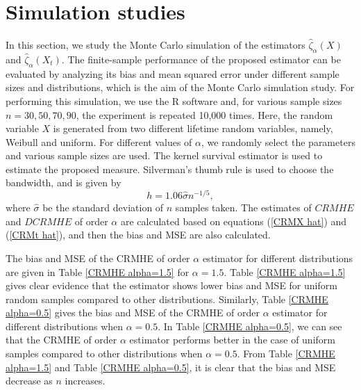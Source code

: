 \documentclass[11pt,reqno]{amsart}
\theoremstyle{tight}
\begin{document}
 \section {Simulation studies}
In this section, we study the Monte Carlo simulation of the estimators $ \widehat{\zeta}_{\alpha}(X)$ and $ \widehat{\zeta}_{\alpha}(X_t)$. The finite-sample performance of the proposed estimator can be evaluated by analyzing its bias and mean squared error under different sample sizes and distributions, which is the aim of the Monte Carlo simulation study. For performing this simulation, we use the R software and, for various sample sizes $n=30, 50, 70, 90$, the experiment is repeated 10,000 times. Here, the random variable $X$ is generated from two different lifetime random variables, namely, Weibull and uniform. For different values of $\alpha$, we randomly select the parameters and various sample sizes are used. The kernel survival estimator is used to estimate the proposed measure. Silverman's thumb rule is used to choose the bandwidth, and is given by
\[
h=1.06 \widehat\sigma {n}^ {-1/5},
\] where $\widehat\sigma$ be the standard deviation of $n$ samples taken. The estimates of $CRMHE$ and $DCRMHE$ of order $\alpha$ are calculated based on equations (\ref{CRMX hat}) and (\ref{CRMt hat}), and then the bias and MSE are also calculated.\par

 The bias and MSE of the CRMHE of order $\alpha$ estimator for different distributions are given in Table \ref{CRMHE alpha=1.5} for $\alpha=1.5$. Table \ref{CRMHE alpha=1.5} gives clear evidence that the estimator shows lower bias and MSE for uniform random samples compared to other distributions. Similarly, Table \ref{CRMHE alpha=0.5} gives the bias and MSE of the CRMHE of order $\alpha$ estimator for different distributions when $\alpha=0.5$. In Table \ref{CRMHE alpha=0.5}, we can see that the CRMHE of order $\alpha$ estimator performs better in the case of uniform samples compared to other distributions when $\alpha=0.5$. From Table \ref{CRMHE alpha=1.5} and Table \ref{CRMHE alpha=0.5}, it is clear that the bias and MSE decrease as $n$ increases.
\end{document}
